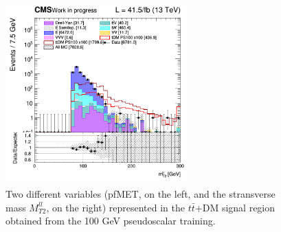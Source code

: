 \documentclass[a4paper, 10pt, openright]{report}
\begin{document}
\begin{figure}[htbp]
{\begin{minipage}[b]{.48\textwidth}
\end{minipage}\hfill
\begin{minipage}[b]{.48\textwidth}
\includegraphics[width=7cm, height=7cm]{figs/2017/SmearSR-ttDM-pseudo100/log_cratio_TTbar_topCR_ll_BDT_ttDM100_mt2ll.png}
\end{minipage} \hfill
}
\caption{Two different variables (pf\ac{MET}, on the left, and the stransverse mass $M_{T2}^{ll}$, on the right) represented in the $t \bar t$+DM signal region obtained from the 100 GeV pseudoscalar training.}
\label{fig:SR6}
\end{figure}
\end{document}
